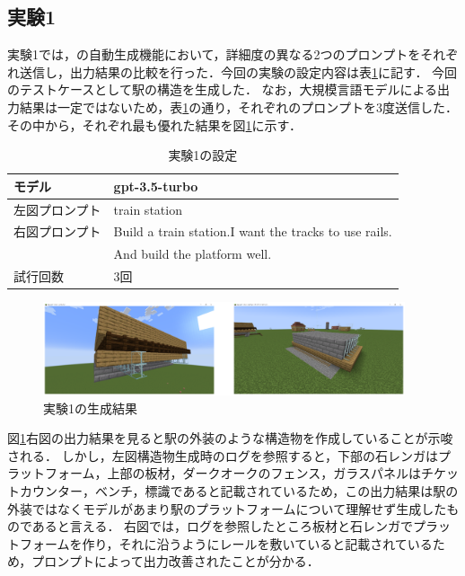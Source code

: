 \subsection{実験1}\label{sec:ex1}
実験1では，{\mason}の自動生成機能において，詳細度の異なる2つのプロンプトをそれぞれ送信し，出力結果の比較を行った．今回の実験の設定内容は表\ref{tab:setting1}に記す．
今回のテストケースとして駅の構造を生成した．
なお，大規模言語モデルによる出力結果は一定ではないため，表\ref{tab:setting1}の通り，それぞれのプロンプトを3度送信した．
その中から，それぞれ最も優れた結果を図\ref{fig:station1}に示す．
\begin{table}[H]
    \caption{実験1の設定}\label{tab:setting1}
    \centering
    \begin{tabular}{ll}
        \hline \hline
        モデル & gpt-3.5-turbo \\
        \hline
        左図プロンプト & train station \\
        \hline
        右図プロンプト & Build a train station.I want the tracks to use rails. \\
        　 & And build the platform well. \\
        \hline
        試行回数 & 3回 \\
        \hline
    \end{tabular}
\end{table}

\begin{figure}[H]
    \centering
    \includegraphics[width=0.95\textwidth]{fig/train_station1.PNG}
    \caption{実験1の生成結果}
    \label{fig:station1}
\end{figure}

図\ref{fig:station1}右図の出力結果を見ると駅の外装のような構造物を作成していることが示唆される．
しかし，左図構造物生成時のログを参照すると，下部の石レンガはプラットフォーム，上部の板材，ダークオークのフェンス，ガラスパネルはチケットカウンター，ベンチ，標識であると記載されているため，この出力結果は駅の外装ではなくモデルがあまり駅のプラットフォームについて理解せず生成したものであると言える．
右図では，ログを参照したところ板材と石レンガでプラットフォームを作り，それに沿うようにレールを敷いていると記載されているため，プロンプトによって出力改善されたことが分かる．

